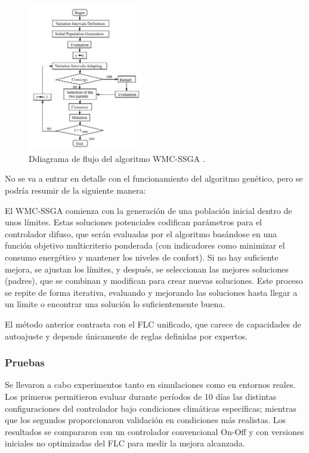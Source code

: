 \begin{figure}[H]
	\centering
	\includegraphics[width=0.45\textwidth]{imgs/flowchart-ga.JPG}
	\caption{Ddiagrama de flujo del algoritmo WMC-SSGA \parencite{alcala2003fuzzy}.}
	\label{fig:flowchart-ga}
\end{figure}

No se va a entrar en detalle con el funcionamiento del algoritmo genético, pero se podría resumir de la siguiente manera:

El WMC-SSGA comienza con la generación de una población inicial dentro de unos límites. Estas soluciones potenciales codifican parámetros para el controlador difuso, que serán evaluadas por el algoritmo basándose en una función objetivo multicriterio ponderada (con indicadores como minimizar el consumo energético y mantener los niveles de confort). Si no hay suficiente mejora, se ajustan los límites, y después, se seleccionan las mejores soluciones (padres), que se combinan y modifican para crear nuevas soluciones. Este proceso se repite de forma iterativa, evaluando y mejorando las soluciones hasta llegar a un límite o encontrar una solución lo suficientemente buena.

El método anterior contrasta con el FLC unificado, que carece de capacidades de autoajuste y depende únicamente de reglas definidas por expertos.

\subsubsection{Pruebas}

Se llevaron a cabo experimentos tanto en simulaciones como en entornos reales. Los primeros permitieron evaluar durante períodos de 10 días las distintas configuraciones del controlador bajo condiciones climáticas específicas; mientras que los segundos proporcionaron validación en condiciones más realistas. Los resultados se compararon con un controlador convencional On-Off y con versiones iniciales no optimizadas del FLC para medir la mejora alcanzada.


